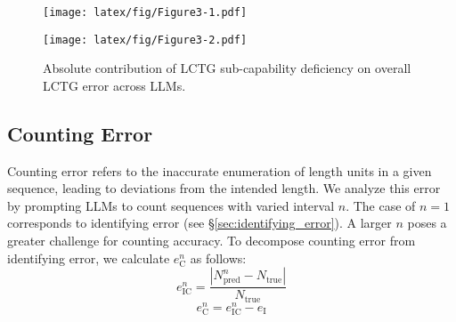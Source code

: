 


\begin{figure*}[t]
    \begin{minipage}{0.51\textwidth}
        \centering
        \texttt{[image: latex/fig/Figure3-1.pdf]}
    \end{minipage}
    \hfill
    \begin{minipage}{0.51\textwidth}
        \centering
        \texttt{[image: latex/fig/Figure3-2.pdf]}
    \end{minipage}

    \caption{Absolute contribution of LCTG sub-capability deficiency on overall LCTG error across LLMs.}
    \vspace{-12pt}
    \label{fig:Figure3}
\end{figure*}

\subsection{Counting Error}
\label{sec:counting_error}
Counting error refers to the inaccurate enumeration of length units in a given sequence, leading to deviations from the intended length. 
We analyze this error by prompting LLMs to count sequences with varied interval $n$. 
The case of \( n = 1 \) corresponds to identifying error (see \S\ref{sec:identifying_error}). 
A larger $n$ poses a greater challenge for counting accuracy.
To decompose counting error from identifying error, we calculate $e_{\text{C}}^n$ as follows:
\begin{equation}
e_{\text{IC}}^n = \frac{|N_{\mathrm{pred}}^{n} - N_{\mathrm{true}}|}{N_{\mathrm{true}}} 
\label{eq:e12}
\end{equation}
\begin{equation}
e_{\text{C}}^n = e_{\text{IC}}^n - e_{\text{I}}
\label{eq:e2}
\end{equation}


